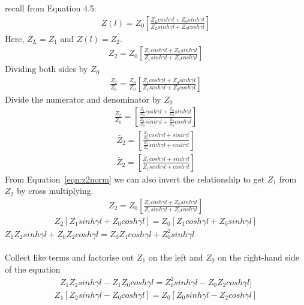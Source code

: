 recall from Equation 4.5: 
\begin{align*}
Z(l) = Z_0\left[\frac{Z_Lcosh\gamma l + Z_0sinh\gamma l}{Z_Lsinh\gamma l + Z_0cosh\gamma l}\right]
\end{align*}
Here, $Z_L = Z_1$ and $Z(l) = Z_2$.\\
\begin{align}
Z_2 = Z_0\left[\frac{Z_1cosh\gamma l + Z_0sinh\gamma l}{Z_1 sinh\gamma l + Z_0 cosh\gamma l}\right]
\label{eqn:z2norm}
\end{align}
Dividing both sides by $Z_0$
\begin{align*}
\frac{Z_2}{Z_0} = \frac{Z_0}{Z_0} \left[\frac{Z_1cosh\gamma l + Z_0sinh\gamma l}{Z_1 sinh\gamma l + Z_0 cosh\gamma l}\right]
\end{align*}
Divide the numerator and denominator by $Z_0$
\begin{align*}
\frac{Z_2}{Z_0} = \left[\frac{\frac{Z_1}{Z_0}cosh\gamma l + \frac{Z_0}{Z_0}sinh\gamma l}{\frac{Z_1}{Z_0}sinh\gamma l + \frac{Z_0}{Z_0}cosh\gamma l}\right]
\end{align*}
\begin{align*}
\bar{Z}_2 = \left[\frac{\frac{Z_1}{Z_0}cosh\gamma l + sinh\gamma l}{\frac{Z_1}{Z_0}sinh\gamma l + cosh\gamma l}\right]
\end{align*}
\begin{align*}
\bar{Z}_2 = \left[\frac{\bar{Z}_1cosh\gamma l + sinh\gamma l}{\bar{Z}_1sinh\gamma l + cosh\gamma l}\right]
\end{align*}
From Equation~\ref{eqn:z2norm} we can also invert the relationship to get $Z_1$ from $Z_2$ by cross multiplying.
\begin{align*}
Z_2 = Z_0\left[\frac{Z_1cosh\gamma l + Z_0sinh\gamma l}{Z_1 sinh\gamma l + Z_0 cosh\gamma l}\right]
\end{align*}
\begin{align*}
Z_2[Z_1sinh\gamma l + Z_0cosh\gamma l] = Z_0[Z_1cosh\gamma l + Z_0sinh\gamma l]
\end{align*}
$Z_1Z_2sinh\gamma l + Z_0Z_2cosh\gamma l = Z_0Z_1cosh\gamma l + Z_0^2sinh\gamma l$\\\\
Collect like terms and factorise out $Z_1$ on the left and $Z_0$ on the right-hand side of the equation
\begin{align*}
Z_1Z_2sinh\gamma l - Z_1Z_0cosh\gamma l = Z_0^2sinh\gamma l - Z_0Z_2cosh\gamma l]
\end{align*}
\begin{align*}
Z_1[Z_2sinh\gamma l - Z_0cosh\gamma l] = Z_0[Z_0sinh\gamma l - Z_2cosh\gamma l]
\end{align*}
